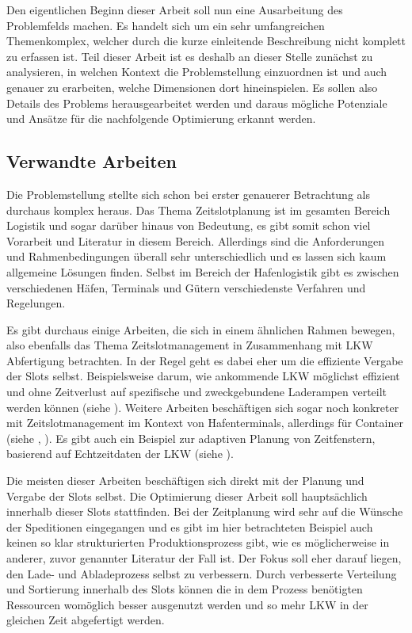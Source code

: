 Den eigentlichen Beginn dieser Arbeit soll nun eine Ausarbeitung des Problemfelds machen. Es handelt sich um ein sehr umfangreichen Themenkomplex, welcher durch die kurze einleitende Beschreibung nicht komplett zu erfassen ist. Teil dieser Arbeit ist es deshalb an dieser Stelle zunächst zu analysieren, in welchen Kontext die Problemstellung einzuordnen ist und auch genauer zu erarbeiten, welche Dimensionen dort hineinspielen. Es sollen also Details des Problems herausgearbeitet werden und daraus mögliche Potenziale und Ansätze für die nachfolgende Optimierung erkannt werden.

\subsection{Verwandte Arbeiten} 

Die Problemstellung stellte sich schon bei erster genauerer Betrachtung als durchaus komplex heraus. Das Thema Zeitslotplanung ist im gesamten Bereich Logistik und sogar darüber hinaus von Bedeutung, es gibt somit schon viel Vorarbeit und Literatur in diesem Bereich. Allerdings sind die Anforderungen und Rahmenbedingungen überall sehr unterschiedlich und es lassen sich kaum allgemeine Lösungen finden. Selbst im Bereich der Hafenlogistik gibt es zwischen verschiedenen Häfen, Terminals und Gütern verschiedenste Verfahren und Regelungen.

Es gibt durchaus einige Arbeiten, die sich in einem ähnlichen Rahmen bewegen, also ebenfalls das Thema Zeitslotmanagement in Zusammenhang mit LKW Abfertigung betrachten. In der Regel geht es dabei eher um die effiziente Vergabe der Slots selbst. Beispielsweise darum, wie ankommende LKW möglichst effizient und ohne Zeitverlust auf spezifische und zweckgebundene Laderampen verteilt werden können (siehe \cite{truckDockAllocation}). Weitere Arbeiten beschäftigen sich sogar noch konkreter mit Zeitslotmanagement im Kontext von Hafenterminals, allerdings für Container (siehe \cite{vergleichbareArbeiten2}, \cite{vergleichbareArbeiten1}). Es gibt auch ein Beispiel zur adaptiven Planung von Zeitfenstern, basierend auf Echtzeitdaten der LKW (siehe \cite{vergleichbareArbeiten3}). 

Die meisten dieser Arbeiten beschäftigen sich direkt mit der Planung und Vergabe der Slots selbst. Die Optimierung dieser Arbeit soll hauptsächlich innerhalb dieser Slots stattfinden. Bei der Zeitplanung wird sehr auf die Wünsche der Speditionen eingegangen und es gibt im hier betrachteten Beispiel auch keinen so klar strukturierten Produktionsprozess gibt, wie es möglicherweise in anderer, zuvor genannter Literatur der Fall ist. Der Fokus soll eher darauf liegen, den Lade- und Abladeprozess selbst zu verbessern. Durch verbesserte Verteilung und Sortierung innerhalb des Slots können die in dem Prozess benötigten Ressourcen womöglich besser ausgenutzt werden und so mehr LKW in der gleichen Zeit abgefertigt werden.



